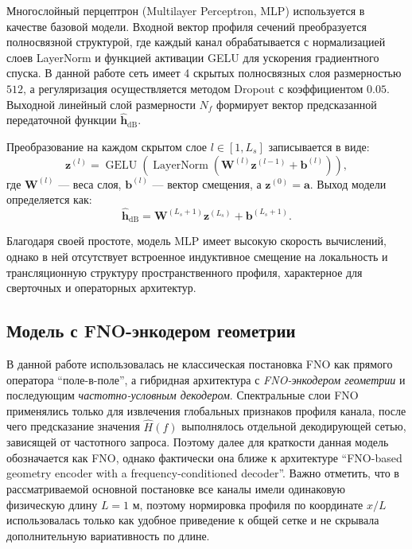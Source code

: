 Многослойный перцептрон (Multilayer Perceptron, MLP) используется в качестве базовой модели. Входной вектор профиля сечений преобразуется полносвязной структурой, где каждый канал обрабатывается с нормализацией слоев LayerNorm и функцией активации GELU для ускорения градиентного спуска. В данной работе сеть имеет 4 скрытых полносвязных слоя размерностью $512$, а регуляризация осуществляется методом Dropout с коэффициентом $0.05$. Выходной линейный слой размерности $N_f$ формирует вектор предсказанной передаточной функции $\widehat{\mathbf{h}}_{\mathrm{dB}}$.

Преобразование на каждом скрытом слое $l \in [1, L_s]$ записывается в виде:
\begin{equation}
    \mathbf{z}^{(l)} = \operatorname{GELU} \left( \operatorname{LayerNorm} \left( \mathbf{W}^{(l)} \mathbf{z}^{(l-1)} + \mathbf{b}^{(l)} \right) \right),
\end{equation}
где $\mathbf{W}^{(l)}$ — веса слоя, $\mathbf{b}^{(l)}$ — вектор смещения, а $\mathbf{z}^{(0)} = \mathbf{a}$. Выход модели определяется как:
\begin{equation}
    \widehat{\mathbf{h}}_{\mathrm{dB}} = \mathbf{W}^{(L_s+1)} \mathbf{z}^{(L_s)} + \mathbf{b}^{(L_s+1)}.
\end{equation}

Благодаря своей простоте, модель MLP имеет высокую скорость вычислений, однако в ней отсутствует встроенное индуктивное смещение на локальность и трансляционную структуру пространственного профиля, характерное для сверточных и операторных архитектур.

\subsection{Модель с FNO-энкодером геометрии}
\label{subsec:fno}

В данной работе использовалась не классическая постановка FNO как прямого оператора ``поле-в-поле'', а гибридная архитектура с \emph{FNO-энкодером геометрии} и последующим \emph{частотно-условным декодером}. Спектральные слои FNO~\cite{li2020fourier} применялись только для извлечения глобальных признаков профиля канала, после чего предсказание значения $\widehat{H}(f)$ выполнялось отдельной декодирующей сетью, зависящей от частотного запроса. Поэтому далее для краткости данная модель обозначается как FNO, однако фактически она ближе к архитектуре ``FNO-based geometry encoder with a frequency-conditioned decoder''. Важно отметить, что в рассматриваемой основной постановке все каналы имели одинаковую физическую длину $L=1$ м, поэтому нормировка профиля по координате $x/L$ использовалась только как удобное приведение к общей сетке и не скрывала дополнительную вариативность по длине.

